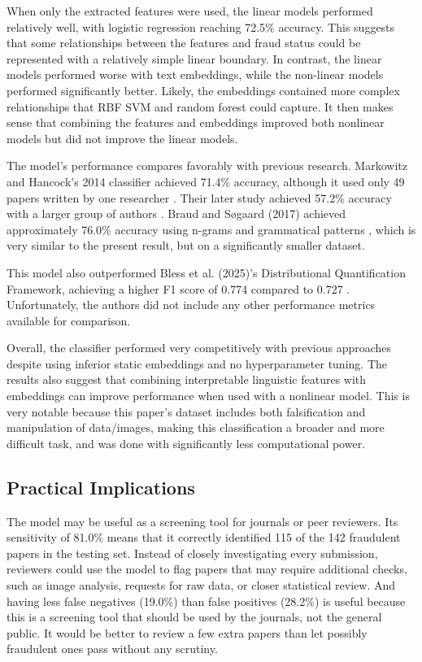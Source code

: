 \documentclass[11pt,letterpaper]{article}
\begin{document}
When only the extracted features were used, the linear models performed relatively well, with logistic regression reaching 72.5\% accuracy. This suggests that some relationships between the features and fraud status could be represented with a relatively simple linear boundary. In contrast, the linear models performed worse with text embeddings, while the non-linear models performed significantly better. Likely, the embeddings contained more complex relationships that RBF SVM and random forest could capture. It then makes sense that combining the features and embeddings improved both nonlinear models but did not improve the linear models.

The model's performance compares favorably with previous research. Markowitz and Hancock's 2014 classifier achieved 71.4\% accuracy, although it used only 49 papers written by one researcher \cite{markowitz2014}. Their later study achieved 57.2\% accuracy with a larger group of authors \cite{markowitz2016}. Braud and S{\o}gaard (2017) achieved approximately 76.0\% accuracy using n-grams and grammatical patterns \cite{braud2017}, which is very similar to the present result, but on a significantly smaller dataset.

This model also outperformed Bless et al. (2025)'s Distributional Quantification Framework, achieving a higher F1 score of 0.774 compared to 0.727 \cite{bless2025}. Unfortunately, the authors did not include any other performance metrics available for comparison.

Overall, the classifier performed very competitively with previous approaches despite using inferior static embeddings and no hyperparameter tuning. The results also suggest that combining interpretable linguistic features with embeddings can improve performance when used with a nonlinear model. This is very notable because this paper's dataset includes both falsification and manipulation of data/images, making this classification a broader and more difficult task, and was done with significantly less computational power.

\subsection{Practical Implications}

The model may be useful as a screening tool for journals or peer reviewers. Its sensitivity of 81.0\% means that it correctly identified 115 of the 142 fraudulent papers in the testing set. Instead of closely investigating every submission, reviewers could use the model to flag papers that may require additional checks, such as image analysis, requests for raw data, or closer statistical review. And having less false negatives (19.0\%) than false positives (28.2\%) is useful because this is a screening tool that should be used by the journals, not the general public. It would be better to review a few extra papers than let possibly fraudulent ones pass without any scrutiny.
\end{document}

